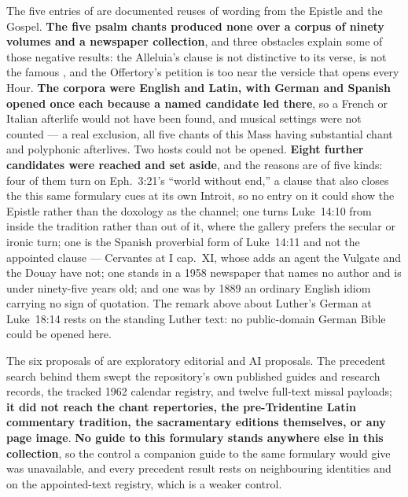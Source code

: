 The five entries of  are documented
reuses of wording from the Epistle and the Gospel. \textbf{The five psalm chants
produced none over a corpus of ninety volumes and a newspaper collection}, and
three obstacles explain some of those negative results: the Alleluia's clause is
not distinctive to its verse,  is not the famous
, and the Offertory's petition is too near the versicle that
opens every Hour. \textbf{The corpora were English and Latin, with German and
Spanish opened once each because a named candidate led there}, so a French or
Italian afterlife would not have been found, and musical settings were not
counted --- a real exclusion, all five chants of this Mass having substantial
chant and polyphonic afterlives. Two hosts could not be opened. \textbf{Eight
further candidates were reached and set aside}, and the reasons are of five
kinds: four of them turn on Eph.~3:21's ``world without end,'' a clause that
also closes the  this same formulary cues at its own
Introit, so no entry on it could show the Epistle rather than the doxology as
the channel; one turns Luke~14:10 from inside the tradition rather than out of
it, where the gallery prefers the secular or ironic turn; one is the Spanish
proverbial form of Luke~14:11 and not the appointed clause --- Cervantes at
 I cap.~XI, whose  adds an agent the
Vulgate and the Douay have not; one stands in a 1958 newspaper that names no
author and is under ninety-five years old; and one was by 1889 an ordinary
English idiom carrying no sign of quotation. The remark above
about Luther's German at Luke~18:14 rests on the standing Luther text: no
public-domain German Bible could be opened here.

The six proposals of  are
exploratory editorial and AI proposals. The precedent search behind them swept
the repository's own published guides and research records, the tracked 1962
calendar registry, and twelve full-text missal payloads; \textbf{it did not reach
the chant repertories, the pre-Tridentine Latin commentary tradition, the
sacramentary editions themselves, or any page image}. \textbf{No guide to this
formulary stands anywhere else in this collection}, so the control a companion
guide to the same formulary would give was unavailable, and every precedent
result rests on neighbouring identities and on the appointed-text registry,
which is a weaker control.

